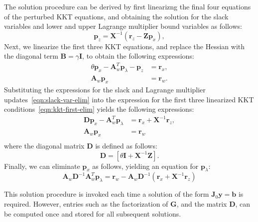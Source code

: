 \documentclass[12pt]{article}
\newcommand{\mb}{\mathbf}
\begin{document}
The solution procedure can be derived by first linearizng the final
four equations of the perturbed KKT equations, and obtaining the
solution for the slack variables and lower and upper Lagrange
multiplier bound variables as follows:
%
\begin{equation}
  \label{eqn:slack-var-elim}
  \mb{p}_{z} = \mb{X}^{-1}(\mb{r}_{z} - \mb{Z} \mb{p}_{x} ),
\end{equation}
Next, we linearize the first three KKT equations, and replace the
Hessian with the diagonal term $\mb{B} = \gamma \mb{I}$, to obtain the
following expressions:
\begin{equation}
  \label{eqn:kkt-first-elim}
  \begin{aligned}
    \theta \mb{p}_{x} - \mb{A}_{w}^{T}\mb{p}_{\lambda} - \mb{p}_{z} & = \mb{r}_{x}, \\
    \mb{A}_{w} \mb{p}_{x} & = \mb{r}_{w}.
  \end{aligned}
\end{equation}
Substituting the expressions for the slack and Lagrange multiplier
updates~\eqref{eqn:slack-var-elim} into the expression for the first
three linearized KKT conditions~\eqref{eqn:kkt-first-elim} yields the
following expressions:
%
\begin{equation}
  \label{eqn:kkt-x-lagrange}
  \begin{aligned}
    \mb{D} \mb{p}_{x} - \mb{A}_{w}^{T}\mb{p}_{\lambda} & = 
    \mb{r}_{x} + \mb{X}^{-1}\mb{r}_{z}, \\
    \mb{A}_{w} \mb{p}_{x} & = \mb{r}_{w} \\
    \end{aligned}
\end{equation}
where the diagonal matrix $\mb{D}$ is defined as follows:
\begin{equation*}
  \mb{D} = \left[ \theta \mb{I} + \mb{X}^{-1}\mb{Z} \right].
\end{equation*}
%
Finally, we can eliminate $\mb{p}_{x}$ as follows, yielding
an equation for $\mb{p}_{\lambda}$:
\begin{equation}
  \mb{A}_{w}\mb{D}^{-1}\mb{A}_{w}^{T} \mb{p}_{\lambda} = \mb{r}_{w} - \mb{A}_{w}\mb{D}^{-1}\left( \mb{r}_{x} + \mb{X}^{-1} \mb{r}_{z}\right)
\end{equation}

This solution procedure is invoked each time a solution of the form
$\mb{J}_{0}\mb{y} = \mb{b}$ is required. However, entries such as the
factorization of $\mb{G}$, and the matrix $\mb{D}$, can be computed
once and stored for all subsequent solutions.
\end{document}
